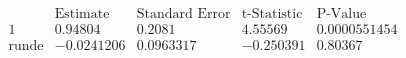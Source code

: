 \[\begin{array}{l|llll}
 \text{} & \text{Estimate} & \text{Standard Error} & \text{t-Statistic} & \text{P-Value} \\
\hline
 1 & 0.94804 & 0.2081 & 4.55569 & 0.0000551454 \\
 \text{runde} & -0.0241206 & 0.0963317 & -0.250391 & 0.80367 \\
\end{array}\]


